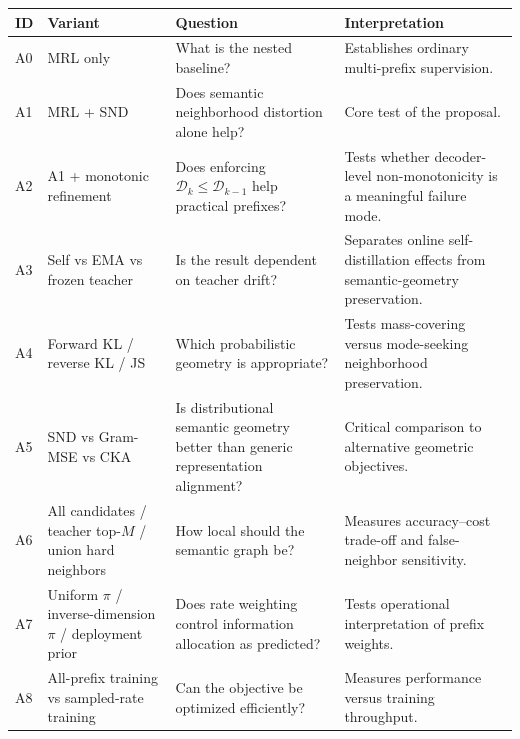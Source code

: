 \documentclass[11pt]{article}
\newcommand{\cD}{\mathcal{D}}
\begin{document}
\begin{table}[t]
\centering
\small
\begin{tabularx}{\textwidth}{
    >{\raggedright\arraybackslash}p{}
    >{\raggedright\arraybackslash}p{}
    >{\raggedright\arraybackslash}X
    >{\raggedright\arraybackslash}X
}
\toprule
\textbf{ID}
&
\textbf{Variant}
&
\textbf{Question}
&
\textbf{Interpretation}
\\
\midrule

A0 &
MRL only &
What is the nested baseline? &
Establishes ordinary multi-prefix supervision.
\\

A1 &
MRL + SND &
Does semantic neighborhood distortion alone help? &
Core test of the proposal.
\\

A2 &
A1 + monotonic refinement &
Does enforcing $\cD_k\leq\cD_{k-1}$ help practical prefixes? &
Tests whether decoder-level non-monotonicity is a meaningful failure mode.
\\

A3 &
Self vs EMA vs frozen teacher &
Is the result dependent on teacher drift? &
Separates online self-distillation effects from semantic-geometry preservation.
\\

A4 &
Forward KL / reverse KL / JS &
Which probabilistic geometry is appropriate? &
Tests mass-covering versus mode-seeking neighborhood preservation.
\\

A5 &
SND vs Gram-MSE vs CKA &
Is distributional semantic geometry better than generic representation alignment? &
Critical comparison to alternative geometric objectives.
\\

A6 &
All candidates / teacher top-$M$ / union hard neighbors &
How local should the semantic graph be? &
Measures accuracy--cost trade-off and false-neighbor sensitivity.
\\

A7 &
Uniform $\pi$ / inverse-dimension $\pi$ / deployment prior &
Does rate weighting control information allocation as predicted? &
Tests operational interpretation of prefix weights.
\\

A8 &
All-prefix training vs sampled-rate training &
Can the objective be optimized efficiently? &
Measures performance versus training throughput.
\\


\end{tabularx}
\end{table}
\end{document}
